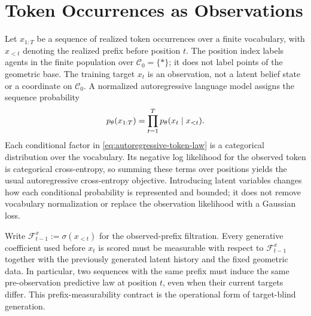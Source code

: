 \chapter{Token Occurrences as Observations}

Let $x_{1:T}$ be a sequence of realized token occurrences over a finite vocabulary, with $x_{<t}$ denoting the realized prefix before position $t$. The position index labels agents in the finite population over $\mathcal C_0=\{\ast\}$; it does not label points of the geometric base. The training target $x_t$ is an observation, not a latent belief state or a coordinate on $\mathcal C_0$. A normalized autoregressive language model assigns the sequence probability
\begin{equation}
p_\theta(x_{1:T})=\prod_{t=1}^{T}p_\theta(x_t\mid x_{<t}).
\label{eq:autoregressive-token-law}
\end{equation}
Each conditional factor in \cref{eq:autoregressive-token-law} is a categorical distribution over the vocabulary. Its negative log likelihood for the observed token is categorical cross-entropy, so summing these terms over positions yields the usual autoregressive cross-entropy objective. Introducing latent variables changes how each conditional probability is represented and bounded; it does not remove vocabulary normalization or replace the observation likelihood with a Gaussian loss.

Write $\mathscr F_{t-1}^x:=\sigma(x_{<t})$ for the observed-prefix filtration. Every generative coefficient used before $x_t$ is scored must be measurable with respect to $\mathscr F_{t-1}^x$ together with the previously generated latent history and the fixed geometric data. In particular, two sequences with the same prefix must induce the same pre-observation predictive law at position $t$, even when their current targets differ. This prefix-measurability contract is the operational form of target-blind generation.

